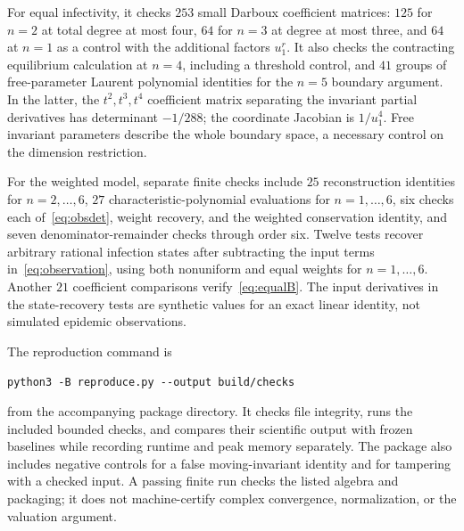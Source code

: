 \documentclass[11pt]{article}
\theoremstyle{remark}\newtheorem{remark}[theorem]{Remark}
\begin{document}
For equal infectivity, it checks $253$ small Darboux coefficient matrices: $125$ for $n=2$ at total degree at most four, $64$ for $n=3$ at degree at most three, and $64$ at $n=1$ as a control with the additional factors $u_1^r$. It also checks the contracting equilibrium calculation at $n=4$, including a threshold control, and $41$ groups of free-parameter Laurent polynomial identities for the $n=5$ boundary argument. In the latter, the $t^2,t^3,t^4$ coefficient matrix separating the invariant partial derivatives has determinant $-1/288$; the coordinate Jacobian is $1/u_1^4$. Free invariant parameters describe the whole boundary space, a necessary control on the dimension restriction.

For the weighted model, separate finite checks include $25$ reconstruction identities for $n=2,\ldots,6$, $27$ characteristic-polynomial evaluations for $n=1,\ldots,6$, six checks each of~\eqref{eq:obsdet}, weight recovery, and the weighted conservation identity, and seven denominator-remainder checks through order six. Twelve tests recover arbitrary rational infection states after subtracting the input terms in~\eqref{eq:observation}, using both nonuniform and equal weights for $n=1,\ldots,6$. Another $21$ coefficient comparisons verify~\eqref{eq:equalB}. The input derivatives in the state-recovery tests are synthetic values for an exact linear identity, not simulated epidemic observations.

The reproduction command is
\begin{center}\texttt{python3 -B reproduce.py -{}-output build/checks}\end{center}
from the accompanying package directory. It checks file integrity, runs the included bounded checks, and compares their scientific output with frozen baselines while recording runtime and peak memory separately. The package also includes negative controls for a false moving-invariant identity and for tampering with a checked input. A passing finite run checks the listed algebra and packaging; it does not machine-certify complex convergence, normalization, or the valuation argument.


\end{document}
